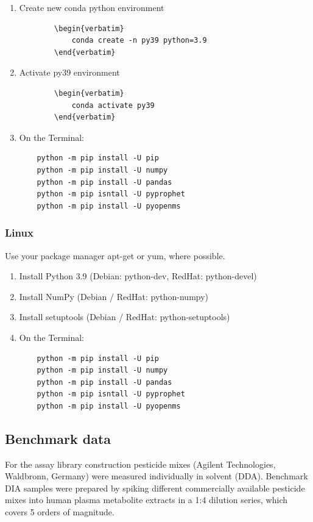 \begin{enumerate}
  \item Create new conda python environment
    \begin{lstlisting}
    	\begin{verbatim}
    		conda create -n py39 python=3.9
    	\end{verbatim}
    \end{lstlisting} 
    \item Activate py39 environment
    \begin{lstlisting}
    	\begin{verbatim}
    		conda activate py39
    	\end{verbatim}
    \end{lstlisting} 
  \item On the Terminal:
    \begin{listing}
\begin{verbatim}
    python -m pip install -U pip
    python -m pip install -U numpy
    python -m pip install -U pandas
    python -m pip isntall -U pyprophet
    python -m pip install -U pyopenms
    \end{verbatim}
\end{listing}
\end{enumerate}

\subsubsection{Linux}
Use your package manager apt-get or yum, where possible.
\begin{enumerate}
  \item Install Python 3.9 (Debian: python-dev, RedHat: python-devel)
  \item Install NumPy (Debian / RedHat: python-numpy)
  \item Install setuptools (Debian / RedHat: python-setuptools)
  \item On the Terminal:
    \begin{listing}
\begin{verbatim}
    python -m pip install -U pip
    python -m pip install -U numpy
    python -m pip install -U pandas
    python -m pip isntall -U pyprophet
    python -m pip install -U pyopenms
    \end{verbatim}
\end{listing}
\end{enumerate}

\subsection{Benchmark data}
For the assay library construction pesticide mixes (Agilent Technologies, Waldbronn, Germany) were measured individually in solvent (DDA). 
Benchmark DIA samples were prepared by spiking different commercially available pesticide mixes into human plasma metabolite extracts in a 1:4 dilution series, which covers 5 orders of magnitude.


